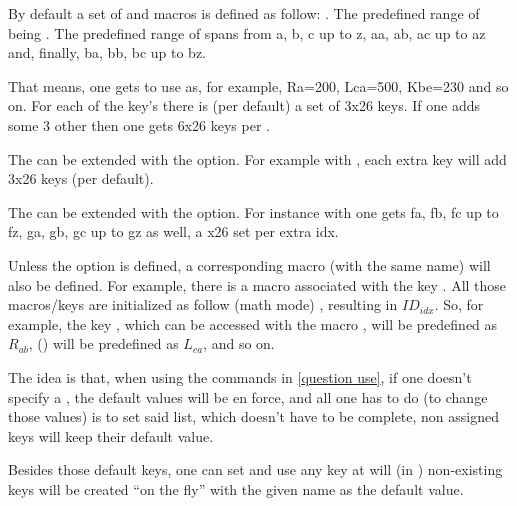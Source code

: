 \documentclass[10pt]{article}
\begin{document}
By default a set of  and macros is defined as follow: . The predefined range of  being . The predefined range of  spans from a, b, c up to z, aa, ab, ac up to az and, finally, ba, bb, bc up to bz. 
\begin{tsremark}
That means, one gets to use  as, for example, Ra=200, Lca=500, Kbe=230 and so on. For each of the key's  there is (per default) a set of 3x26 keys. If one adds some 3 other  then one gets 6x26 keys per .
\end{tsremark}
\begin{tsremark}
The  can be extended with the  option. For example with , each extra key will add 3x26 keys (per default).
\end{tsremark}
\begin{tsremark}
The  can be extended with the  option. For instance with  one gets fa, fb, fc up to fz, ga, gb, gc up to gz as well, a x26 set per extra idx.
\end{tsremark}

Unless the  option is defined, a corresponding macro (with the same name) will also be defined. For example, there is a macro \tsobj{\Ra} associated with the key .
All those macros/keys are initialized  as follow (math mode) , resulting in $ID_{idx}$. So, for example, the key , which can be accessed with the macro \tsobj{\Rab},  will be predefined as $R_{ab}$,  (\tsobj{\Lca}) will be predefined as $L_{ca}$, and so on.

The idea is that, when using the commands in \ref{question use}, if one doesn't specify a , the default values will be en force, and all one has to do (to change those values) is to set said list, which doesn't have to be complete, non assigned keys will keep their default value.

Besides those default keys, one can set and use any key at will (in ) non-existing keys will be created ``on the fly'' with the given name as the default value.
\end{document}
